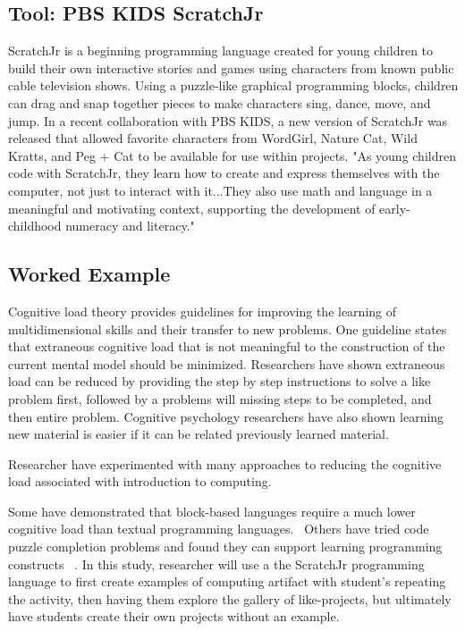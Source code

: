 \documentclass[11pt, letterpaper, onecolumn]{article}
\begin{document}
\subsection{Tool: PBS KIDS ScratchJr}
%
ScratchJr is a beginning programming language created for young children to build their own interactive stories and games using characters from known public cable television shows.
%
Using a puzzle-like graphical programming blocks, children can drag and snap together pieces to make characters sing, dance, move, and jump. 
%
In a recent collaboration with PBS KIDS, a new version of ScratchJr was released that allowed favorite characters from WordGirl, Nature Cat, Wild Kratts, and Peg + Cat to be available for use within projects.
%
"As young children code with ScratchJr, they learn how to create and express themselves with the computer, not just to interact with it...They also use math and language in a meaningful and motivating context, supporting the development of early-childhood numeracy and literacy." ~\cite{scratchjr}
%


\subsection{Worked Example}
%
%
Cognitive load theory provides guidelines for improving the learning of multidimensional skills and their transfer to new problems. 
%
One guideline states that extraneous cognitive load that is not meaningful to the construction of the current mental model should be minimized. 
%
Researchers have shown extraneous load can be reduced by providing the step by step instructions to solve a like problem first, followed by a problems will missing steps to be completed, and then entire problem\cite{paas2003edupsych}.
%
Cognitive psychology researchers have also shown learning new material is easier if it can be related previously learned material.
%

%
Researcher have experimented with many approaches to reducing the cognitive load associated with introduction to computing. 

Some have demonstrated that block-based languages require a much lower cognitive load than textual programming languages.~\cite{Price2015ICER,Weintrop2015ICER,Morrison2015ICER}
%
Others have tried code puzzle completion problems and found they can support learning programming constructs ~\cite{Harms2017Dissertation}.
%
In this study, researcher will use a the ScratchJr programming language to first create examples of computing artifact with student's repeating the activity, then having them explore the gallery of like-projects, but ultimately have students create their own projects without an example.
\end{document}
